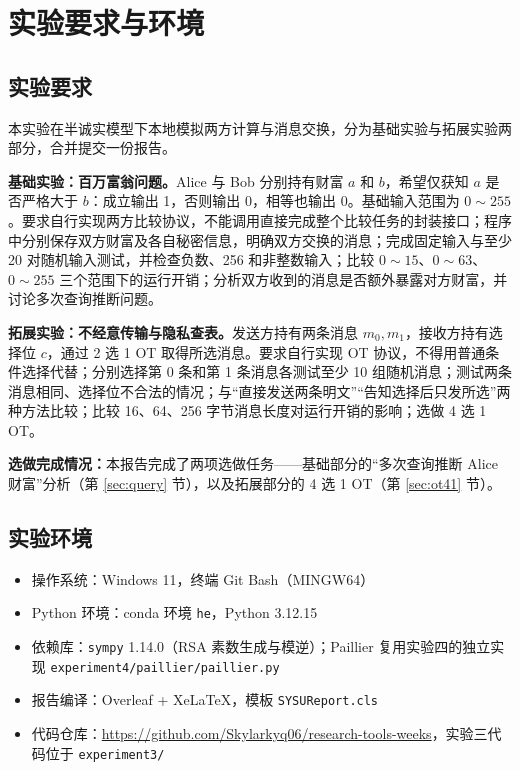 \documentclass{SYSUReport}
\date{2026 年 11 月 11 日}
\begin{document}
\cover
\thispagestyle{empty}
\clearpage

\tableofcontents
\clearpage

\setcounter{page}{1}

\section{实验要求与环境}

\subsection{实验要求}

本实验在半诚实模型下本地模拟两方计算与消息交换，分为基础实验与拓展实验两部分，合并提交一份报告。

\textbf{基础实验：百万富翁问题。}Alice 与 Bob 分别持有财富 $a$ 和 $b$，希望仅获知 $a$ 是否严格大于 $b$：成立输出 1，否则输出 0，相等也输出 0。基础输入范围为 $0\sim 255$。要求自行实现两方比较协议，不能调用直接完成整个比较任务的封装接口；程序中分别保存双方财富及各自秘密信息，明确双方交换的消息；完成固定输入与至少 20 对随机输入测试，并检查负数、256 和非整数输入；比较 $0\sim 15$、$0\sim 63$、$0\sim 255$ 三个范围下的运行开销；分析双方收到的消息是否额外暴露对方财富，并讨论多次查询推断问题。

\textbf{拓展实验：不经意传输与隐私查表。}发送方持有两条消息 $m_0,m_1$，接收方持有选择位 $c$，通过 2 选 1 OT 取得所选消息。要求自行实现 OT 协议，不得用普通条件选择代替；分别选择第 0 条和第 1 条消息各测试至少 10 组随机消息；测试两条消息相同、选择位不合法的情况；与“直接发送两条明文”“告知选择后只发所选”两种方法比较；比较 16、64、256 字节消息长度对运行开销的影响；选做 4 选 1 OT。

\textbf{选做完成情况：}本报告完成了两项选做任务——基础部分的“多次查询推断 Alice 财富”分析（第 \ref{sec:query} 节），以及拓展部分的 4 选 1 OT（第 \ref{sec:ot41} 节）。

\subsection{实验环境}

\begin{itemize}
  \item 操作系统：Windows 11，终端 Git Bash（MINGW64）
  \item Python 环境：conda 环境 \texttt{he}，Python 3.12.15
  \item 依赖库：\texttt{sympy} 1.14.0（RSA 素数生成与模逆）；Paillier 复用实验四的独立实现 \texttt{experiment4/paillier/paillier.py}
  \item 报告编译：Overleaf + XeLaTeX，模板 \texttt{SYSUReport.cls}
  \item 代码仓库：\url{https://github.com/Skylarkyq06/research-tools-weeks}，实验三代码位于 \texttt{experiment3/}
\end{itemize}
\end{document}
